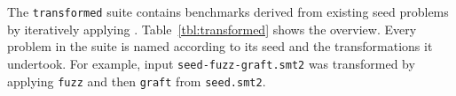     
    


 The \texttt{transformed}
suite contains benchmarks derived from existing seed problems by
iteratively applying \transformer{}. Table~\ref{tbl:transformed} shows
the overview. Every problem in the suite is named according to its
seed and the transformations it undertook. For example, input
\texttt{seed-fuzz-graft.smt2} was transformed by applying
\texttt{fuzz} and then \texttt{graft} from \texttt{seed.smt2}.

